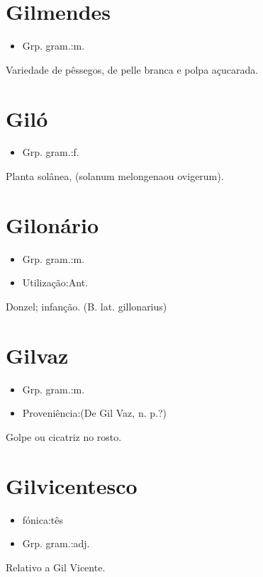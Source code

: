 \section{Gilmendes}
\begin{itemize}
\item {Grp. gram.:m.}
\end{itemize}
Variedade de pêssegos, de pelle branca e polpa açucarada.
\section{Giló}
\begin{itemize}
\item {Grp. gram.:f.}
\end{itemize}
Planta solânea, (\textunderscore solanum melongena\textunderscore  ou \textunderscore ovigerum\textunderscore ).
\section{Gilonário}
\begin{itemize}
\item {Grp. gram.:m.}
\end{itemize}
\begin{itemize}
\item {Utilização:Ant.}
\end{itemize}
Donzel; infanção.
(B. lat. \textunderscore gillonarius\textunderscore )
\section{Gilvaz}
\begin{itemize}
\item {Grp. gram.:m.}
\end{itemize}
\begin{itemize}
\item {Proveniência:(De \textunderscore Gil Vaz\textunderscore , n. p.?)}
\end{itemize}
Golpe ou cicatriz no rosto.
\section{Gilvicentesco}
\begin{itemize}
\item {fónica:tês}
\end{itemize}
\begin{itemize}
\item {Grp. gram.:adj.}
\end{itemize}
Relativo a Gil Vicente.
